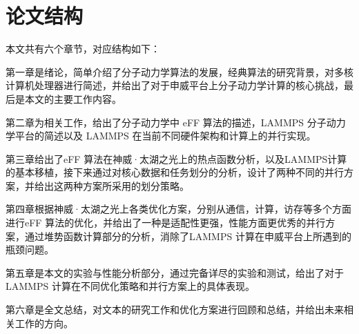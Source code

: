 \section{论文结构}
本文共有六个章节，对应结构如下：

第一章是绪论，简单介绍了分子动力学算法的发展，经典算法的研究背景，对多核计算机处理器进行简述，并给出了对于申威平台上分子动力学计算的核心挑战，最后是本文的主要工作内容。

第二章为相关工作，给出了分子动力学中 eFF 算法的描述，LAMMPS 分子动力学平台的简述以及 LAMMPS 在当前不同硬件架构和计算上的并行实现。

第三章给出了eFF 算法在神威·太湖之光上的热点函数分析，以及LAMMPS计算的基本移植，接下来通过对核心数据和任务划分的分析，设计了两种不同的并行方案，并给出这两种方案所采用的划分策略。

第四章根据神威·太湖之光上各类优化方案，分别从通信，计算，访存等多个方面进行eFF 算法的优化，并给出了一种是适配性更强，性能方面更优秀的并行方案，通过堆势函数计算部分的分析，消除了LAMMPS 计算在申威平台上所遇到的瓶颈问题。

第五章是本文的实验与性能分析部分，通过完备详尽的实验和测试，给出了对于 LAMMPS 计算在不同优化策略和并行方案上的具体表现。

第六章是全文总结，对文本的研究工作和优化方案进行回顾和总结，并给出未来相关工作的方向。

